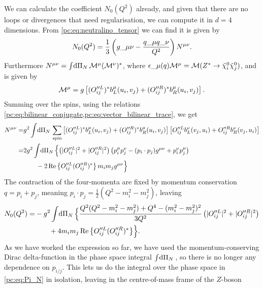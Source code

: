 \documentclass[../main.tex]{subfiles}
\begin{document}
We can calculate the coefficient \(N_0(Q^2)\) already, and given that there are no loops or divergences that need regularisation, we can compute it in \(d=4\) dimensions.
From \cref{pc:eq:neutralino_tensor} we can find it is given by
\begin{equation}
  N_0(Q^2) = \frac{1}{3} \pclosed{g\_{\mu\nu} - \frac{q\_\mu q\_\nu}{Q^2}} N\^{\mu\nu}.
\end{equation}
Furthermore \(N\^{\mu\nu} = \integral{\Pi_N} \M\^\mu (\M\^\nu)^\ast\), where \(\epsilon\_\mu(q) \M\^\mu = \M(Z^\ast \to \tilde\chi^0_i \tilde\chi^0_j)\), and is given by
\begin{equation}
  \M\^\mu = g \bclosed{(O_{ij}^{\prime\prime L})^\ast b^\mu_L(u_i, v_j) + (O_{ij}^{\prime\prime R})^\ast b^\mu_R(u_i, v_j)}.
\end{equation}
Summing over the spins, using the relations \cref{pc:eq:bilinear_conjugate,pc:eq:vector_bilinear_trace}, we get
\begin{align}
  \nonumber
  N\^{\mu\nu} = & g^2 \integral{\Pi_N} \sum_\text{spin} \bclosed{(O_{ij}^{\prime\prime L})^\ast b^\mu_L(u_i, v_j) + (O_{ij}^{\prime\prime R})^\ast b^\mu_R(u_i, v_j)} \bclosed{O_{ij}^{\prime\prime L} b^\nu_L(v_j, u_i) + O_{ij}^{\prime\prime R} b^\nu_R(v_j, u_i)} \\
  \nonumber
  =             & 2g^2 \integral{\Pi_N} \Bigl\{\pclosed{|O_{ij}^{\prime\prime L}|^2 + |O_{ij}^{\prime\prime R}|^2} \pclosed{p_i^\mu p_j^\nu - (p_i\cdot p_j)\g + p_i^\nu p_j^\mu}                                                                                     \\
                & \qquad - 2\Re{O_{ij}^{\prime\prime L} (O_{ij}^{\prime\prime R})^\ast} m_i m_j \g \Bigr\}
\end{align}
The contraction of the four-momenta are fixed by momentum conservation \(q = p_i + p_j\), meaning \(p_i \cdot p_j = \frac{1}{2}(Q^2-m_i^2-m_j^2)\), leaving
\begin{align}
  N_0(Q^2) = & -g^2 \int \!\mathrm{d}\Pi_N\, \Bigl\{\frac{Q^2(Q^2-m_i^2-m_j^2) + Q^4 - (m_i^2-m_j^2)^2}{3Q^2} \left(|O_{ij}^{\prime\prime L}|^2+|O_{ij}^{\prime\prime R}|^2\right) \\
             & \qquad + 4m_i m_j \operatorname{Re}\left\{O_{ij}^{\prime\prime L} (O_{ij}^{\prime\prime R})^\ast\right\} \Bigr\}.
\end{align}
As we have worked the expression so far, we have used the momentum-conserving Dirac delta-function in the phase space integral \(\int \!\mathrm{d}\Pi_N\,\), so there is no longer any dependence on \(p_{i/j}\).
This lets us do the integral over the phase space in \cref{pc:eq:Pi_N} in isolation, leaving in the centre-of-mass frame of the \(Z\)-boson
\end{document}
